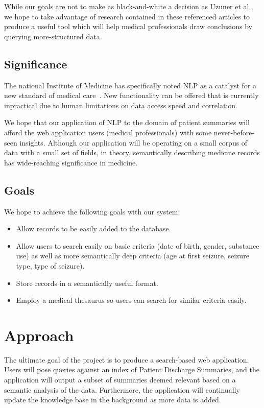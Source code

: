 \documentclass[12pt]{article}
\begin{document}
While our goals are not to make as black-and-white a decision as Uzuner et al., we hope to take 
advantage of research contained in these referenced articles to produce a useful tool which will
help medical professionals draw conclusions by querying more-structured data.

\subsection{Significance}
The national Institute of Medicine has specifically noted NLP as a catalyst for a new
standard of medical care~\cite{friedman}. New functionality can be offered that is currently
inpractical due to human limitations on data access speed and correlation.

We hope that our application of NLP to the domain of patient summaries will afford the
web application users (medical professionals) with some never-before-seen insights.
Although our application will be operating on a small corpus of data with a small set 
of fields, in theory, semantically describing medicine records has wide-reaching 
significance in medicine.

\subsection{Goals}
We hope to achieve the following goals with our system:
\begin{itemize}
	\item Allow records to be easily added to the database.
	\item Allow users to search easily on basic criteria (date of birth, gender,
substance use) as well as more semantically deep criteria (age at first seizure,
seizure type, type of seizure).
    \item Store records in a semantically useful format.
	\item Employ a medical thesaurus so users can search for similar criteria easily.
\end{itemize}

\section{Approach}
The ultimate goal of the project is to produce a search-based web application.
Users will pose queries against an index of Patient Discharge Summaries, and the
application will output a subset of summaries deemed relevant based on a semantic
analysis of the data. Furthermore, the application will continually update the
knowledge base in the background as more data is added.
\end{document}
